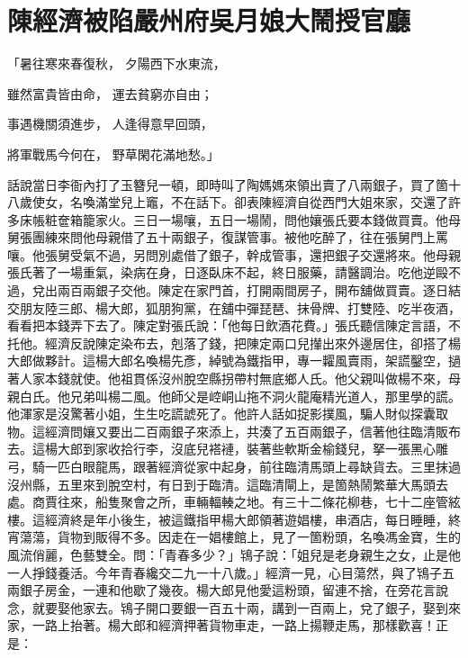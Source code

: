 %

\chapter{陳經濟被陷嚴州府\KG 吳月娘大鬧授官廳}


\begin{showcontents}{}



「暑往寒來春復秋，  夕陽西下水東流，

雖然富貴皆由命，  運去貧窮亦自由；

事遇機關須進步，  人逢得意早回頭，

將軍戰馬今何在，  野草閑花滿地愁。」

話說當日李衙內打了玉簪兒一頓，即時叫了陶媽媽來領出賣了八兩銀子，買了箇十八歲使女，名喚滿堂兒上竈，不在話下。卻表陳經濟自從西門大姐來家，交還了許多床帳粧奩箱籠家火。三日一場嚷，五日一場鬧，問他孃張氏要本錢做買賣。他母舅張團練來問他母親借了五十兩銀子，復謀管事。被他吃醉了，往在張舅門上罵嚷。他張舅受氣不過，另問別處借了銀子，幹成管事，還把銀子交還將來。他母親張氏著了一場重氣，染病在身，日逐臥床不起，終日服藥，請醫調治。吃他逆毆不過，兌出兩百兩銀子交他。陳定在家門首，打開兩間房子，開布舖做買賣。逐日結交朋友陸三郎、楊大郎，狐朋狗黨，在舖中彈琵琶、抹骨牌、打雙陸、吃半夜酒，看看把本錢弄下去了。陳定對張氏說：「他每日飲酒花費。」張氏聽信陳定言語，不托他。經濟反說陳定染布去，剋落了錢，把陳定兩口兒攆出來外邊居住，卻搭了楊大郎做夥計。這楊大郎名喚楊先彥，綽號為鐵指甲，專一糶風賣雨，架謊鑿空，撾著人家本錢就使。他祖貫係沒州脫空縣拐帶村無底鄉人氏。他父親叫做楊不來，母親白氏。他兄弟叫楊二風。他師父是崆峒山拖不洞火龍庵精光道人，那里學的謊。他渾家是沒驚著小姐，生生吃謊諕死了。他許人話如捉影撲風，騙人財似探囊取物。這經濟問孃又要出二百兩銀子來添上，共湊了五百兩銀子，信著他往臨清販布去。這楊大郎到家收拾行李，沒底兒褡褳，裝著些軟斯金榆錢兒，拏一張黑心雕弓，騎一匹白眼龍馬，跟著經濟從家中起身，前往臨清馬頭上尋缺貨去。三里抹過沒州縣，五里來到脫空村，有日到于臨清。這臨清閘上，是箇熱鬧繁華大馬頭去處。商賈往來，船隻聚會之所，車輛輻輳之地。有三十二條花柳巷，七十二座管絃樓。這經濟終是年小後生，被這鐵指甲楊大郎領著遊娼樓，串酒店，每日睡睡，終宵蕩蕩，貨物到販得不多。因走在一娼樓館上，見了一箇粉頭，名喚馮金寶，生的風流俏麗，色藝雙全。問：「青春多少？」鴇子說：「姐兒是老身親生之女，止是他一人掙錢養活。今年青春纔交二九一十八歲。」經濟一見，心目蕩然，與了鴇子五兩銀子房金，一連和他歇了幾夜。楊大郎見他愛這粉頭，留連不捨，在旁花言說念，就要娶他家去。鴇子開口要銀一百五十兩，講到一百兩上，兌了銀子，娶到來家，一路上抬著。楊大郎和經濟押著貨物車走，一路上揚鞭走馬，那樣歡喜！正是：


\end{showcontents}
